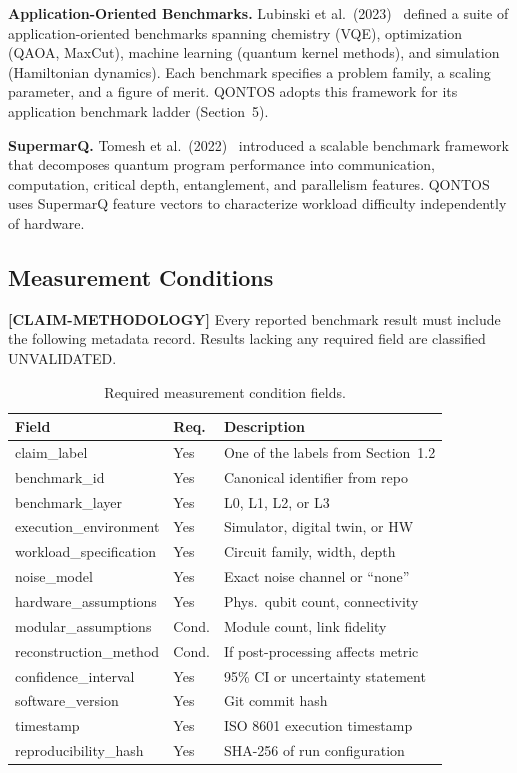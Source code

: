 \documentclass[conference]{IEEEtran}
\begin{document}
\textbf{Application-Oriented Benchmarks.} Lubinski et al.\ (2023)~\cite{lubinski2023} defined a suite of application-oriented benchmarks spanning chemistry (VQE), optimization (QAOA, MaxCut), machine learning (quantum kernel methods), and simulation (Hamiltonian dynamics). Each benchmark specifies a problem family, a scaling parameter, and a figure of merit. QONTOS adopts this framework for its application benchmark ladder (Section~5).

\textbf{SupermarQ.} Tomesh et al.\ (2022)~\cite{tomesh2022} introduced a scalable benchmark framework that decomposes quantum program performance into communication, computation, critical depth, entanglement, and parallelism features. QONTOS uses SupermarQ feature vectors to characterize workload difficulty independently of hardware.

\subsection{Measurement Conditions}

\textbf{[CLAIM-METHODOLOGY]} Every reported benchmark result must include the following metadata record. Results lacking any required field are classified UNVALIDATED.

\begin{table}[H]
\centering
\caption{Required measurement condition fields.}
\label{tab:measurement_conditions}
\begin{tabular}{@{}l l L{3.5cm}@{}}
\toprule
\textbf{Field} & \textbf{Req.} & \textbf{Description} \\
\midrule
claim\_label & Yes & One of the labels from Section~1.2 \\
benchmark\_id & Yes & Canonical identifier from repo \\
benchmark\_layer & Yes & L0, L1, L2, or L3 \\
execution\_environment & Yes & Simulator, digital twin, or HW \\
workload\_specification & Yes & Circuit family, width, depth \\
noise\_model & Yes & Exact noise channel or ``none'' \\
hardware\_assumptions & Yes & Phys.\ qubit count, connectivity \\
modular\_assumptions & Cond. & Module count, link fidelity \\
reconstruction\_method & Cond. & If post-processing affects metric \\
confidence\_interval & Yes & 95\% CI or uncertainty statement \\
software\_version & Yes & Git commit hash \\
timestamp & Yes & ISO 8601 execution timestamp \\
reproducibility\_hash & Yes & SHA-256 of run configuration \\
\bottomrule
\end{tabular}
\end{table}
\end{document}

